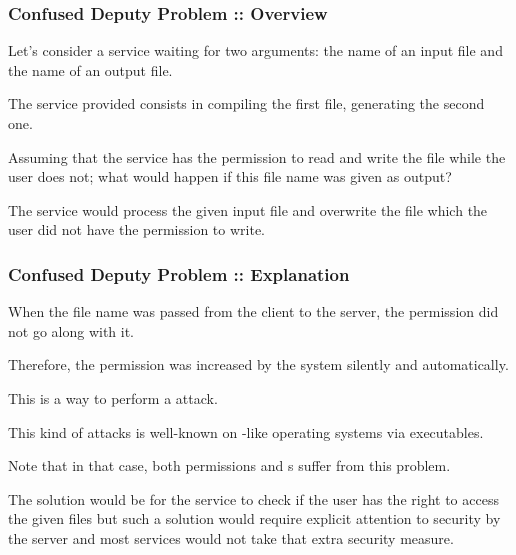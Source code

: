 \begin{frame}
  \frametitle{Confused Deputy Problem :: Overview}

  Let's consider a service waiting for two arguments: the name of an input
  file and the name of an output file.

  \-

  The service provided consists in compiling the first file, generating the
  second one.

  \-

  Assuming that the service has the permission to read and write the
   file while the user does not; what would happen
  if this file name was given as output?

  \-

  The service would process the given input file and overwrite the
   file which the user did not have the permission
  to write.
\end{frame}


\begin{frame}
  \frametitle{Confused Deputy Problem :: Explanation}

  When the file name was passed from the client to the server, the permission
  did not go along with it.

  \-

  Therefore, the permission was increased by the system silently and
  automatically.

  \-

  This is a way to perform a  attack.

  \-

  This kind of attacks is well-known on -like operating systems
  via  executables.

  \-

  Note that in that case, both  permissions and s
  suffer from this problem.

  \-

  The solution would be for the service to check if the user has the right to
  access the given files but such a solution would require explicit attention
  to security by the server and most services would not take that extra
  security measure.
\end{frame}


